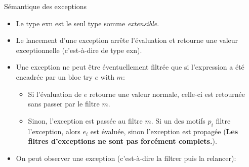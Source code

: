Sémantique des exceptions

\begin{itemize}

  \item Le type \textsf{exn} est le seul type somme \emph{extensible}.

  \item Le lancement d'une exception arrête l'évaluation et retourne
        une valeur exceptionnelle (c'est-à-dire de type \textsf{exn}).

  \item Une exception ne peut être éventuellement filtrée que si
        l'expression a été encadrée par un bloc \textsf{try $e$ with
        $m$}:
        \begin{itemize}
 
          \item Si l'évaluation de $e$ retourne une valeur normale,
                celle-ci est retournée sans passer par le filtre $m$.

          \item Sinon, l'exception est passée au filtre $m$. Si un des
                motifs $p_i$ filtre l'exception, alors $e_i$ est
                évaluée, sinon l'exception est propagée (\textbf{Les
                filtres d'exceptions ne sont pas forcément
                complets.}).

        \end{itemize}

   \item On peut observer une exception (c'est-à-dire la filtrer puis la
         relancer):\\

\end{itemize}
